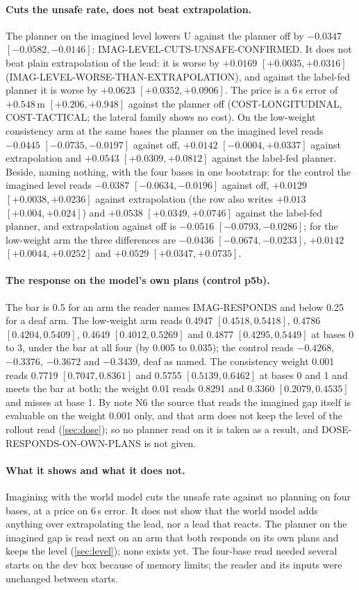 \paragraph{Cuts the unsafe rate, does not beat extrapolation.} The planner on the imagined level lowers U against the planner off by $-0.0347$ $[-0.0582,-0.0146]$: IMAG-LEVEL-CUTS-UNSAFE-CONFIRMED. It does not beat plain extrapolation of the lead: it is worse by $+0.0169$ $[+0.0035,+0.0316]$ (IMAG-LEVEL-WORSE-THAN-EXTRAPOLATION), and against the label-fed planner it is worse by $+0.0623$ $[+0.0352,+0.0906]$. The price is a 6\,s error of $+0.548$\,m $[+0.206,+0.948]$ against the planner off (COST-LONGITUDINAL, COST-TACTICAL; the lateral family shows no cost). On the low-weight consistency arm at the same bases the planner on the imagined level reads $-0.0445$ $[-0.0735,-0.0197]$ against off, $+0.0142$ $[-0.0004,+0.0337]$ against extrapolation and $+0.0543$ $[+0.0309,+0.0812]$ against the label-fed planner. Beside, naming nothing, with the four bases in one bootstrap: for the control the imagined level reads $-0.0387$ $[-0.0634,-0.0196]$ against off, $+0.0129$ $[+0.0038,+0.0236]$ against extrapolation (the row also writes $+0.013$ $[+0.004,+0.024]$) and $+0.0538$ $[+0.0349,+0.0746]$ against the label-fed planner, and extrapolation against off is $-0.0516$ $[-0.0793,-0.0286]$; for the low-weight arm the three differences are $-0.0436$ $[-0.0674,-0.0233]$, $+0.0142$ $[+0.0044,+0.0252]$ and $+0.0529$ $[+0.0347,+0.0735]$.

\paragraph{The response on the model's own plans (control p5b).} The bar is 0.5 for an arm the reader names IMAG-RESPONDS and below 0.25 for a deaf arm. The low-weight arm reads 0.4947 $[0.4518,0.5418]$, 0.4786 $[0.4204,0.5409]$, 0.4649 $[0.4012,0.5269]$ and 0.4877 $[0.4295,0.5449]$ at bases 0 to 3, under the bar at all four (by 0.005 to 0.035); the control reads $-0.4268$, $-0.3376$, $-0.3672$ and $-0.3439$, deaf as named. The consistency weight 0.001 reads 0.7719 $[0.7047,0.8361]$ and 0.5755 $[0.5139,0.6462]$ at bases 0 and 1 and meets the bar at both; the weight 0.01 reads 0.8291 and 0.3360 $[0.2079,0.4535]$ and misses at base 1. By note N6 the source that reads the imagined gap itself is evaluable on the weight 0.001 only, and that arm does not keep the level of the rollout read (\cref{sec:dose}); so no planner read on it is taken as a result, and DOSE-RESPONDS-ON-OWN-PLANS is not given.

\paragraph{What it shows and what it does not.} Imagining with the world model cuts the unsafe rate against no planning on four bases, at a price on 6\,s error. It does not show that the world model adds anything over extrapolating the lead, nor a lead that reacts. The planner on the imagined gap is read next on an arm that both responds on its own plans and keeps the level (\cref{sec:level}); none exists yet. The four-base read needed several starts on the dev box because of memory limits; the reader and its inputs were unchanged between starts.
